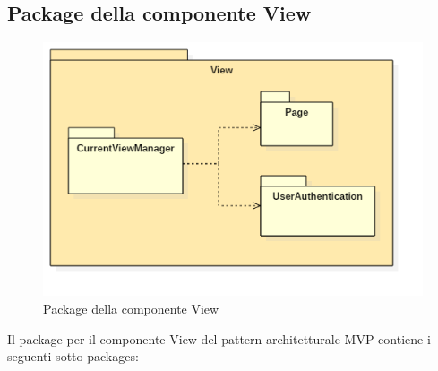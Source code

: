 \documentclass[a4paper,11pt]{article}
\begin{document}
	\subsection{Package della componente View}
	\begin{figure}[h!]
	\begin{center}
		\includegraphics[scale=0.6]{../images/ViewPackage.png}
		\caption{Package della componente View}
	\end{center}
	\end{figure}
	Il package per il componente View del pattern architetturale MVP contiene i seguenti sotto packages:
\end{document}
